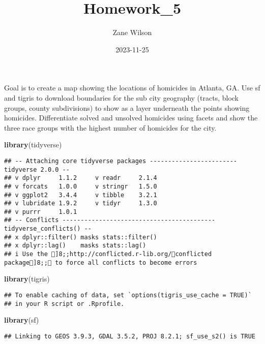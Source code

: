 \documentclass[
]{article}
\title{Homework\_5}
\author{Zane Wilson}
\date{2023-11-25}
\newenvironment{Shaded}{\begin{snugshade}}{\end{snugshade}}
\newcommand{\FunctionTok}[1]{\textcolor[rgb]{0.13,0.29,0.53}{\textbf{#1}}}
\newcommand{\NormalTok}[1]{#1}
\begin{document}
\maketitle

Goal is to create a map showing the locations of homicides in Atlanta,
GA. Use sf and tigris to download boundaries for the sub city geography
(tracts, block groups, county subdivisions) to show as a layer
underneath the points showing homicides. Differentiate solved and
unsolved homicides using facets and show the three race groups with the
highest number of homicides for the city.

\begin{Shaded}
\begin{Highlighting}[]
\FunctionTok{library}\NormalTok{(tidyverse)}
\end{Highlighting}
\end{Shaded}

\begin{verbatim}
## -- Attaching core tidyverse packages ------------------------ tidyverse 2.0.0 --
## v dplyr     1.1.2     v readr     2.1.4
## v forcats   1.0.0     v stringr   1.5.0
## v ggplot2   3.4.4     v tibble    3.2.1
## v lubridate 1.9.2     v tidyr     1.3.0
## v purrr     1.0.1     
## -- Conflicts ------------------------------------------ tidyverse_conflicts() --
## x dplyr::filter() masks stats::filter()
## x dplyr::lag()    masks stats::lag()
## i Use the ]8;;http://conflicted.r-lib.org/conflicted package]8;; to force all conflicts to become errors
\end{verbatim}

\begin{Shaded}
\begin{Highlighting}[]
\FunctionTok{library}\NormalTok{(tigris)}
\end{Highlighting}
\end{Shaded}

\begin{verbatim}
## To enable caching of data, set `options(tigris_use_cache = TRUE)`
## in your R script or .Rprofile.
\end{verbatim}

\begin{Shaded}
\begin{Highlighting}[]
\FunctionTok{library}\NormalTok{(sf)}
\end{Highlighting}
\end{Shaded}

\begin{verbatim}
## Linking to GEOS 3.9.3, GDAL 3.5.2, PROJ 8.2.1; sf_use_s2() is TRUE
\end{verbatim}
\end{document}
